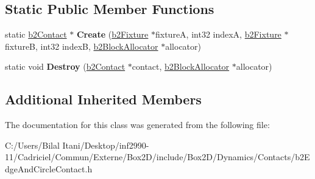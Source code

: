 \subsection*{Static Public Member Functions}
\begin{DoxyCompactItemize}
\item 
static \hyperlink{classb2_contact}{b2\+Contact} $\ast$ {\bfseries Create} (\hyperlink{classb2_fixture}{b2\+Fixture} $\ast$fixtureA, int32 indexA, \hyperlink{classb2_fixture}{b2\+Fixture} $\ast$fixtureB, int32 indexB, \hyperlink{classb2_block_allocator}{b2\+Block\+Allocator} $\ast$allocator)\hypertarget{classb2_edge_and_circle_contact_ad253e184d26e54c60fa874b329f9737e}{}\label{classb2_edge_and_circle_contact_ad253e184d26e54c60fa874b329f9737e}

\item 
static void {\bfseries Destroy} (\hyperlink{classb2_contact}{b2\+Contact} $\ast$contact, \hyperlink{classb2_block_allocator}{b2\+Block\+Allocator} $\ast$allocator)\hypertarget{classb2_edge_and_circle_contact_a7d77dd43691dad8d813450aefdb1e11e}{}\label{classb2_edge_and_circle_contact_a7d77dd43691dad8d813450aefdb1e11e}

\end{DoxyCompactItemize}
\subsection*{Additional Inherited Members}


The documentation for this class was generated from the following file\+:\begin{DoxyCompactItemize}
\item 
C\+:/\+Users/\+Bilal Itani/\+Desktop/inf2990-\/11/\+Cadriciel/\+Commun/\+Externe/\+Box2\+D/include/\+Box2\+D/\+Dynamics/\+Contacts/b2\+Edge\+And\+Circle\+Contact.\+h\end{DoxyCompactItemize}
